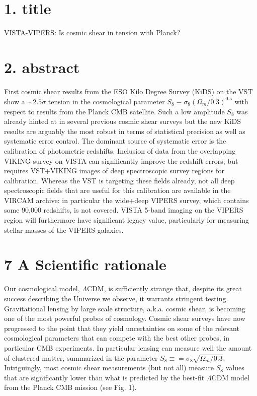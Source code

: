 \documentclass[a4paper, 10pt]{article}
\begin{document}
\section*{1. title}

VISTA-VIPERS: Is cosmic shear in tension with Planck?

\section*{2. abstract}

First cosmic shear results from the ESO Kilo Degree Survey (KiDS) on the VST show a $\sim2.5\sigma$ tension in the cosmological parameter $S_8 \equiv \sigma_8 (\Omega_m/0.3)^{0.5}$ with respect to results from the Planck CMB satellite. Such a low amplitude $S_8$ was already hinted at in several previous cosmic shear surveys but the new KiDS results are arguably the most robust in terms of statistical precision as well as systematic error control. The dominant source of systematic error is the calibration of photometric redshifts. Inclusion of data from the overlapping VIKING survey on VISTA can significantly improve the redshift errors, but requires VST+VIKING images of deep spectroscopic survey regions for calibration. Whereas the VST is targeting these fields already, not all deep spectroscopic fields that are useful for this calibration are available in the VIRCAM archive: in particular the wide+deep VIPERS survey, which contains some 90,000 redshifts, is not covered. VISTA 5-band imaging on the VIPERS region will furthermore have significant legacy value, particularly for measuring stellar masses of the VIPERS galaxies.
 
\section*{7 A Scientific rationale}

Our cosmological model, $\Lambda$CDM, is sufficiently strange that, despite its great success describing the Universe we observe, it warrants stringent testing. Gravitational lensing by large scale structure, a.k.a. cosmic shear, is becoming one of the most powerful probes of cosmology. Cosmic shear surveys have now progressed to the point that they yield uncertainties on some of the relevant cosmological parameters that can compete with the best other probes, in particular CMB experiments. In particular lensing can measure well the amount of clustered matter, summarized in the parameter $S_8\equiv= \sigma_8 \sqrt{\Omega_m/0.3}$. Intriguingly, most cosmic shear measurements (but not all) measure $S_8$ values that are significantly lower than what is predicted by the best-fit $\Lambda$CDM model from the Planck CMB mission (see Fig. 1).
\end{document}
